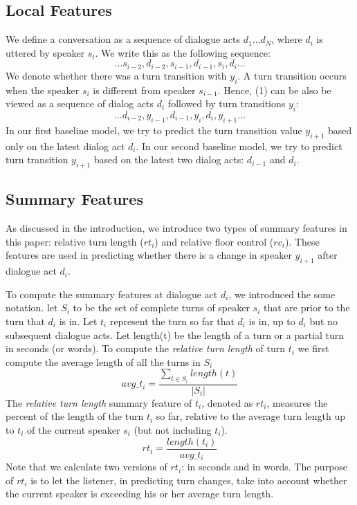 \subsection{Local Features}

     We define a conversation as a sequence of dialogue acts $d_1 \dots d_N$, where $d_i$ is uttered by speaker $s_i$.  We write this as the following sequence:
%
     \begin{equation}
       \ldots  s_{i-2}, d_{i-2}, s_{i-1} , d_{i-1}, s_i, d_i  \ldots
     \end{equation}
     We denote whether there was a turn transition with $y_i$. A turn transition occurs when the speaker $s_i$ is different from speaker $s_{i-1}$. Hence, (1) can be also be viewed as a sequence of dialog acts $d_i$ followed by turn transitions $y_i$:
%
     \begin{equation}
       \ldots    d_{i-2}, y_{i-1}, d_{i-1}, y_{i} , d_i, y_{i+1} \ldots
     \end{equation}
      In our first baseline model, we try to predict the turn transition value $y_{i+1}$ based only on the latest dialog act $d_i$. In our second baseline model, we try to predict turn transition $y_{i+1}$ based on the latest two dialog acts: $d_{i-1}$ and $d_i$.


\subsection{Summary Features}\label{sfeatures}

     As discussed in the introduction, we introduce two types of summary features in this paper: relative turn length ($rt_i$) and relative floor control ($rc_i$).  These features are used in predicting whether there is a change in speaker $y_{i+1}$ after dialogue act $d_i$.

     To compute the summary features at dialogue act $d_i$, we introduced the some notation. let $S_i$ to be the set of complete turns of speaker $s_i$ that are prior to the turn that $d_i$ is in.  Let $t_i$ represent the turn so far that $d_i$ is in, up to $d_i$ but no subsequent dialogue acts.  Let length(t) be the length of a turn or a partial turn in seconds (or words). To compute the \textit{relative turn length} of turn $t_i$ we first compute the average length of all the turns in $S_i$
%
    \begin{equation}
     avg\_t_i = \frac{\sum_{t \in S_i} length(t)}{|S_i|}
     \end{equation}
     The \textit{relative turn length} summary feature of $t_i$, denoted as $rt_i$, measures the percent of the length of the turn $t_i$ so far, relative to the average turn length up to $t_i$ of the current speaker $s_i$ (but not including $t_i$).
%
     \begin{equation}
            rt_i =  \frac{length(t_i)} {avg\_t_i}
     \end{equation}
     Note that we calculate two versions of $rt_i$: in seconds and in words.  The purpose of $rt_i$ is to let the listener, in predicting turn changes, take into account whether the current speaker is exceeding his or her average turn length.

